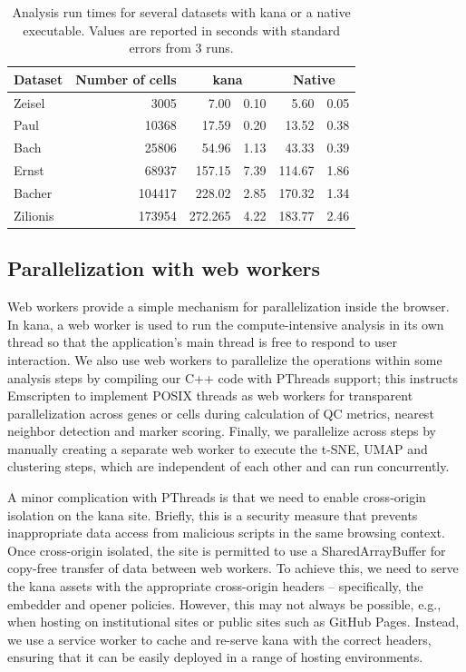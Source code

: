 \documentclass{article}
\begin{document}
\begin{table}
\caption{Analysis run times for several datasets with kana or a native executable.
Values are reported in seconds with standard errors from 3 runs.}
\label{tab:times}
\begin{center}
    \begin{tabular}{l r r@{ $\pm$ }l r@{ $\pm$ }l}
\hline
Dataset & \multicolumn{1}{c}{Number of cells} & \multicolumn{2}{c}{kana} & \multicolumn{2}{c}{Native} \\
\hline
        Zeisel   & 3005   & 7.00 &  0.10 & 5.60 &  0.05 \\
        Paul     & 10368  & 17.59 &  0.20 & 13.52 &  0.38 \\
        Bach     & 25806  & 54.96 &  1.13 & 43.33 &  0.39 \\
        Ernst    & 68937  & 157.15 & 7.39 & 114.67 & 1.86 \\
        Bacher   & 104417 & 228.02 & 2.85 & 170.32 & 1.34 \\
        Zilionis & 173954 & 272.265 & 4.22 & 183.77 & 2.46 \\
\hline
\end{tabular}
\end{center}
\end{table}

\subsection{Parallelization with web workers}

Web workers provide a simple mechanism for parallelization inside the browser.
In kana, a web worker is used to run the compute-intensive analysis in its own thread so that the application's main thread is free to respond to user interaction.
We also use web workers to parallelize the operations within some analysis steps by compiling our C++ code with PThreads support;
this instructs Emscripten to implement POSIX threads as web workers for transparent parallelization across genes or cells during calculation of QC metrics, nearest neighbor detection and marker scoring.
Finally, we parallelize across steps by manually creating a separate web worker to execute the t-SNE, UMAP and clustering steps, which are independent of each other and can run concurrently.

A minor complication with PThreads is that we need to enable cross-origin isolation on the kana site.
Briefly, this is a security measure that prevents inappropriate data access from malicious scripts in the same browsing context.
Once cross-origin isolated, the site is permitted to use a SharedArrayBuffer for copy-free transfer of data between web workers.
To achieve this, we need to serve the kana assets with the appropriate cross-origin headers -- specifically, the embedder and opener policies.
However, this may not always be possible, e.g., when hosting on institutional sites or public sites such as GitHub Pages.
Instead, we use a service worker to cache and re-serve kana with the correct headers,
ensuring that it can be easily deployed in a range of hosting environments.
\end{document}
